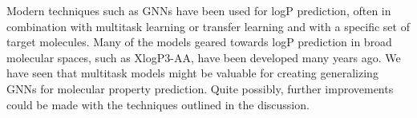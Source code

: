\documentclass{article}
\begin{document}
Modern techniques such as GNNs have been used for logP prediction, often in combination with multitask learning or transfer learning and with a specific set of target molecules. Many of the models geared towards logP prediction in broad molecular spaces, such as XlogP3-AA, have been developed many years ago. We have seen that multitask models might be valuable for creating generalizing GNNs for molecular property prediction. Quite possibly, further improvements could be made with the techniques outlined in the discussion.

\newpage
 

\end{document}
